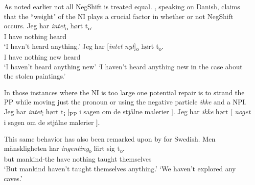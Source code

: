 \documentclass[12pt, letterpaper]{article}
\begin{document}
\ea As noted earlier not all NegShift is treated equal. \citet[65f]{christensenInterfacesNegationSyntax2005}, speaking on Danish, claims that the ``weight" of the NI plays a crucial factor in whether or not NegShift occurs. 
	\ea 
	\gll Jeg har \textit{intet}\textsubscript{o} hørt t\textsubscript{o}.\\
	I have nothing heard\\
	\glt  `I havn't heard anything.'
	\ex 
	\gll Jeg har [\textit{intet} \textit{nyt}]\textsubscript{o} hørt t\textsubscript{o}.\\
	I have nothing new heard\\
	\glt `I haven't heard anything new'
	\glt `I haven't heard anything new in the case about the stolen paintings.'
	\z

\ex In those instances where the NI is too large one potential repair is to strand the PP while moving just the pronoun or using the negative particle \textit{ikke} and a NPI.
	\ea Jeg har \textit{intet}\textsubscript{i} hørt t\textsubscript{i} [\textsubscript{PP} i sagen om de stjålne malerier ].
	\ex Jeg har \textit{ikke} hørt [ \textit{noget} i sagen om de stjålne malerier ].
	\z 
 
\ex This same behavior has also been remarked upon by \citet{penkaNegativeIndefinites2011} for Swedish.
	\ea 
	\gll Men mänskligheten har \textit{ingenting}\textsubscript{o} lärt sig t\textsubscript{o}.\\
	but mankind-the have nothing taught themselves\\
	\glt `But mankind haven't taught themselves anything.'
	\glt `We haven't explored any caves.'
	\z 

\z 
\end{document}
